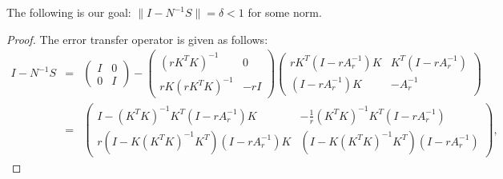 \begin{lemma}
The following is our goal: 
$\|I - N^{-1}S\| = \delta < 1$
for some norm. 
\end{lemma}
\begin{proof}
The error transfer operator is given as follows: 
\begin{eqnarray*}
I - N^{-1}S &=& 
\left ( \begin{matrix}
I & 0 \\ 
0 & I 
\end{matrix} \right ) - \begin{pmatrix}
     (r K^T K)^{-1} &  0 \\
    r K (r K^T K)^{-1} & -r I
    \end{pmatrix} \begin{pmatrix}
    r K^T \left(I - r A_{r}^{-1} \right)K  & K^T (I -  r A_{r}^{-1} ) \\
    (I -  r A_{r}^{-1} ) K  & - A_{r}^{-1}
    \end{pmatrix}   \\
&=& \begin{pmatrix}
I - (K^TK)^{-1} K^T (I - r A_r^{-1}) K&  -\frac{1}{r} (K^TK)^{-1} K^T (I - r A_r^{-1}) \\
r(I - K (K^TK)^{-1} K^T) (I - r A_r^{-1}) K  & (I - K (K^TK)^{-1} K^T) (I - r A_r^{-1})
\end{pmatrix},
\end{eqnarray*}
%


\end{proof}

